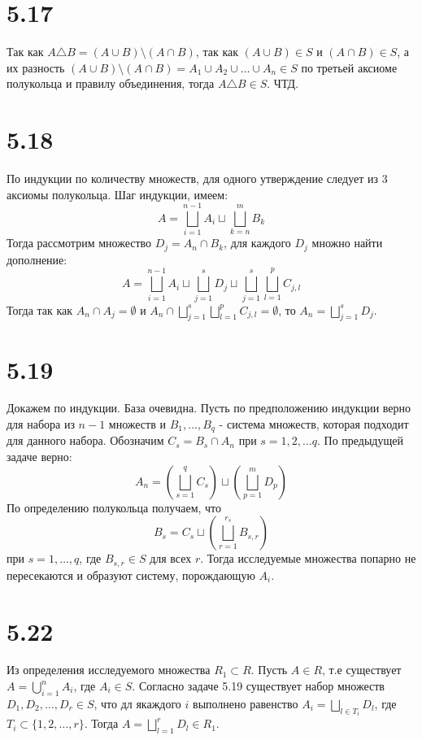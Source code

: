 \documentclass[12pt]{article}
\begin{document}
\section{5.17}
Так как $A \triangle B = (A \cup B) \setminus (A \cap B)$, так как $(A \cup B) \in S$ и $(A \cap B) \in S$,
а их разность $(A \cup B) \setminus (A \cap B) = A_1 \cup A_2 \cup \dots \cup A_n \in S$  по третьей аксиоме полукольца и правилу объединения, тогда $A \triangle B \in S$. ЧТД.
\section{5.18}
По индукции по количеству множеств, для одного утверждение следует из 3 аксиомы полукольца. Шаг индукции, имеем:
\[
    A = \bigsqcup_{i=1}^{n-1} A_i \sqcup \bigsqcup_{k=n}^{m} B_k
\]
Тогда рассмотрим множество $D_j = A_n \cap B_k$, для каждого $D_j$ множно найти дополнение:
\[
    A = \bigsqcup_{i=1}^{n-1} A_i \sqcup \bigsqcup_{j=1}^{s} D_j \sqcup \bigsqcup_{j=1}^{s} \bigsqcup_{l=1}^{p} C_{j, l}
\]
Тогда так как $A_n \cap A_j = \emptyset$ и $A_n \cap \bigsqcup_{j=1}^{s} \bigsqcup_{l=1}^{p} C_{j, l} = \emptyset$, то $A_n = \bigsqcup_{j=1}^{s} D_j$.
\section{5.19}
Докажем по индукции. База очевидна. Пусть по предположению индукции верно для набора из $n - 1$ множеств и 
$B_1, \dots , B_q$ - система множеств, которая подходит для данного набора. Обозначим $C_s = B_s \cap A_n$ при 
$s = 1, 2, \dots q.$ По предыдущей задаче верно: 
\[
    A_n = \left( \bigsqcup_{s=1}^q C_s \right) \sqcup \left( \bigsqcup_{p=1}^m D_p \right) 
\]    
По определению полукольца получаем, что 
\[
    B_s = C_s \sqcup \left( \bigsqcup_{r=1}^{r_s} B_{s, r}\right) 
\]
при $s = 1, \dots , q$, где $B_{s, r} \in S$ для всех $r$. Тогда исследуемые множества попарно не пересекаются и образуют систему, порождающую $A_i$.    
\section{5.22}
Из определения исследуемого множества $R_1 \subset R$. Пусть $A \in R$, т.е 
существует $A = \bigcup_{i=1}^{n} A_i$, где $A_i \in S$. Согласно задаче 5.19 
существует набор множеств $D_1, D_2, \dots, D_r \in S$, что дл якаждого $i$ выполнено равенство
$A_i = \bigsqcup_{l \in T_i} D_l$, где $T_i \subset \{1, 2, \dots, r\}$. Тогда $A = \bigsqcup_{l=1}^r D_l \in R_1$.         
\end{document}

